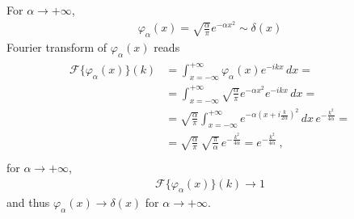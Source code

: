 \documentclass[letterpaper,10pt,english]{jupyterBook}
\begin{document}
\sphinxAtStartPar
{} For \(\alpha \rightarrow +\infty\),
\begin{equation*}
\begin{split}\varphi_{\alpha}(x) = \sqrt{\frac{\alpha}{\pi}}e^{-\alpha x^2} \sim \delta(x)\end{split}
\end{equation*}
\sphinxAtStartPar
Fourier transform of \(\varphi_{\alpha}(x)\) reads
\begin{equation*}
\begin{split}\begin{aligned}
 \mathscr{F}\{ \varphi_{\alpha}(x) \}(k)
 & = \int_{x=-\infty}^{+\infty} \varphi_\alpha(x) e^{-ikx} \, dx = \\
 & = \int_{x=-\infty}^{+\infty} \sqrt{\frac{\alpha}{\pi}} e^{-\alpha x^2} e^{-ikx} \, dx = \\
 & = \sqrt{\frac{\alpha}{\pi}} \int_{x=-\infty}^{+\infty} e^{-\alpha \left( x + i \frac{k}{2 \alpha} \right)^2} \, dx \, e^{-\frac{k^2}{4 \alpha}} = \\
 & = \sqrt{\frac{\alpha}{\pi}} \, \sqrt{\frac{\pi}{\alpha}} \, e^{-\frac{k^2}{4 \alpha}} =  e^{-\frac{k^2}{4 \alpha}} \ ,\\
\end{aligned}\end{split}
\end{equation*}
\sphinxAtStartPar
for \(\alpha \rightarrow +\infty\),
\begin{equation*}
\begin{split}\mathscr{F}\{ \varphi_{\alpha}(x) \}(k) \rightarrow 1\end{split}
\end{equation*}
\sphinxAtStartPar
and thus \(\varphi_\alpha(x) \rightarrow \delta(x)\) for \(\alpha \rightarrow +\infty\).
\end{document}
